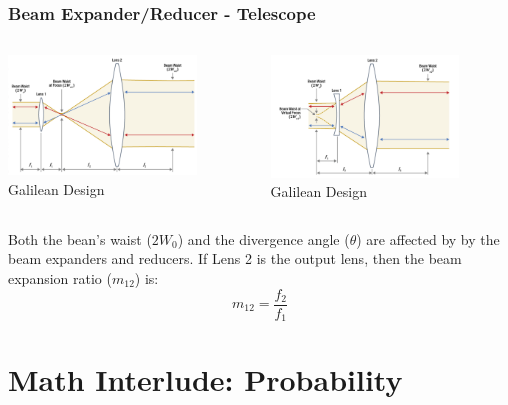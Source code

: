 \documentclass{beamer}
\begin{document}
\begin{frame}\frametitle{Beam Expander/Reducer - Telescope}
\begin{columns}
\begin{column}{5.5cm}
\begin{center}
\includegraphics[width=5cm]{fig/beamXkepler.png}
Galilean Design
\end{center}
\end{column}
\begin{column}{5.5cm}
\begin{center}
\includegraphics[width=5cm]{fig/beamXgalileo.png}
Galilean Design
\end{center}
\end{column}
\end{columns}

\vspace{0.25cm}
Both the bean's waist ($2W_0$) and the divergence angle ($\theta$) are affected by by the beam expanders and reducers. If Lens 2 is the output lens, then the beam expansion ratio ($m_{12}$) is: 
\begin{equation}
m_{12} = \frac{f_2}{f_1}
\end{equation}

\end{frame}



\section{Math Interlude: Probability}
\end{document}
